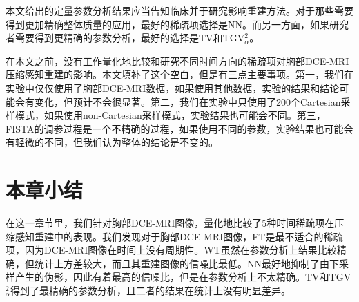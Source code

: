 本文给出的定量参数分析结果应当告知临床并于研究影响重建方法。对于那些需要得到更加精确整体质量的应用，最好的稀疏项选择是NN。而另一方面，如果研究者需要得到更精确的参数分析，最好的选择是TV和TGV$_{\alpha}^2$。

在本文之前，没有工作量化地比较和研究不同时间方向的稀疏项对胸部DCE-MRI压缩感知重建的影响。本文填补了这个空白，但是有三点主要事项。第一，我们在实验中仅仅使用了胸部DCE-MRI数据，如果使用其他数据，实验的结果和结论可能会有变化，但预计不会很显著。第二，我们在实验中只使用了200个Cartesian采样模式，如果使用non-Cartesian采样模式，实验结果也可能会不同。第三，FISTA的调参过程是一个不精确的过程，如果使用不同的参数，实验结果也可能会有轻微的不同，但我们认为整体的结论是不变的。

\section{本章小结}
在这一章节里，我们针对胸部DCE-MRI图像，量化地比较了5种时间稀疏项在压缩感知重建中的表现。我们发现对于胸部DCE-MRI图像，FT是最不适合的稀疏项，因为DCE-MRI图像在时间上没有周期性。WT虽然在参数分析上结果比较精确，但统计上方差较大，而且其重建图像的信噪比最低。NN最好地抑制了由下采样产生的伪影，因此有着最高的信噪比，但是在参数分析上不太精确。TV和TGV$_{\alpha}^2$得到了最精确的参数分析，且二者的结果在统计上没有明显差异。



